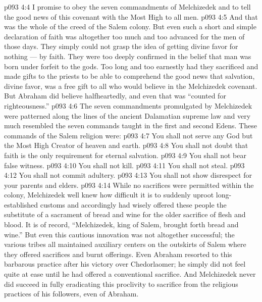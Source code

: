\vs p093 4:4 \bibnobreakspace I promise to obey the seven commandments of Melchizedek and to tell the good news of this covenant with the Most High to all men.
\vs p093 4:5 \pc And that was the whole of the creed of the Salem colony. But even such a short and simple declaration of faith was altogether too much and too advanced for the men of those days. They simply could not grasp the idea of getting divine favor for nothing --- by faith. They were too deeply confirmed in the belief that man was born under forfeit to the gods. Too long and too earnestly had they sacrificed and made gifts to the priests to be able to comprehend the good news that salvation, divine favor, was a free gift to all who would believe in the Melchizedek covenant. But Abraham did believe halfheartedly, and even that was “counted for righteousness.”
\vs p093 4:6 \pc The seven commandments promulgated by Melchizedek were patterned along the lines of the ancient Dalamatian supreme law and very much resembled the seven commands taught in the first and second Edens. These commands of the Salem religion were:
\vs p093 4:7 \bibnobreakspace You shall not serve any God but the Most High Creator of heaven and earth.
\vs p093 4:8 \bibnobreakspace You shall not doubt that faith is the only requirement for eternal salvation.
\vs p093 4:9 \bibnobreakspace You shall not bear false witness.
\vs p093 4:10 \bibnobreakspace You shall not kill.
\vs p093 4:11 \bibnobreakspace You shall not steal.
\vs p093 4:12 \bibnobreakspace You shall not commit adultery.
\vs p093 4:13 \bibnobreakspace You shall not show disrespect for your parents and elders.
\vs p093 4:14 \pc While no sacrifices were permitted within the colony, Melchizedek well knew how difficult it is to suddenly uproot long\hyp{}established customs and accordingly had wisely offered these people the substitute of a sacrament of bread and wine for the older sacrifice of flesh and blood. It is of record, “Melchizedek, king of Salem, brought forth bread and wine.” But even this cautious innovation was not altogether successful; the various tribes all maintained auxiliary centers on the outskirts of Salem where they offered sacrifices and burnt offerings. Even Abraham resorted to this barbarous practice after his victory over Chedorlaomer; he simply did not feel quite at ease until he had offered a conventional sacrifice. And Melchizedek never did succeed in fully eradicating this proclivity to sacrifice from the religious practices of his followers, even of Abraham.
